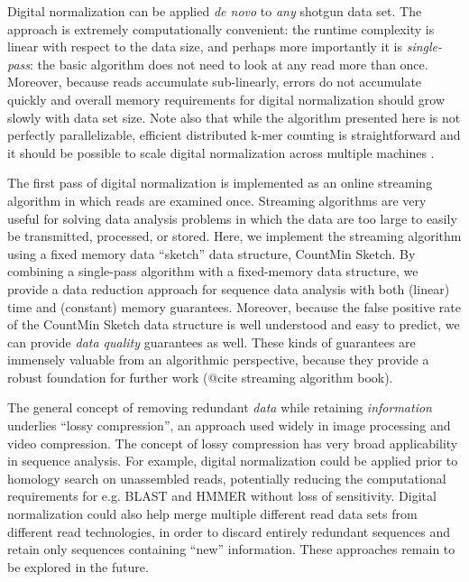 \documentclass[10pt]{article}
\begin{document}
Digital normalization can be applied {\em de novo} to {\em any}
shotgun data set.  The approach is extremely computationally
convenient: the runtime complexity is linear with respect to the data
size, and perhaps more importantly it is {\em single-pass}: the basic
algorithm does not need to look at any read more than once.  Moreover,
because reads accumulate sub-linearly, errors do not accumulate
quickly and overall memory requirements for digital normalization
should grow slowly with data set size.  Note also that while the
algorithm presented here is not perfectly parallelizable, efficient
distributed k-mer counting is straightforward and it should be
possible to scale digital normalization across multiple machines
\cite{pubmed19357099}.

The first pass of digital normalization is implemented as an online
streaming algorithm in which reads are examined once.  Streaming
algorithms are very useful for solving data analysis problems in which
the data are too large to easily be transmitted, processed, or
stored.  Here, we implement the streaming algorithm using a fixed
memory data ``sketch'' data structure, CountMin Sketch.  By combining
a single-pass algorithm with a fixed-memory data structure, we provide
a data reduction approach for sequence data analysis with both
(linear) time and (constant) memory guarantees. Moreover, because the
false positive rate of the CountMin Sketch data structure is well
understood and easy to predict, we can provide {\em data quality}
guarantees as well.  These kinds of guarantees are immensely
valuable from an algorithmic perspective, because they provide a
robust foundation for further work (@cite streaming algorithm book).


The general concept of removing redundant {\em data} while retaining
{\em information} underlies ``lossy compression'', an approach used
widely in image processing and video compression.  The concept of
lossy compression has very broad applicability in sequence analysis.
For example, digital normalization could be applied prior to homology
search on unassembled reads, potentially reducing the computational
requirements for e.g. BLAST and HMMER without loss of sensitivity.
Digital normalization could also help merge multiple different read
data sets from different read technologies, in order to discard
entirely redundant sequences and retain only sequences containing
``new'' information.  These approaches remain to be explored in the future.
\end{document}
